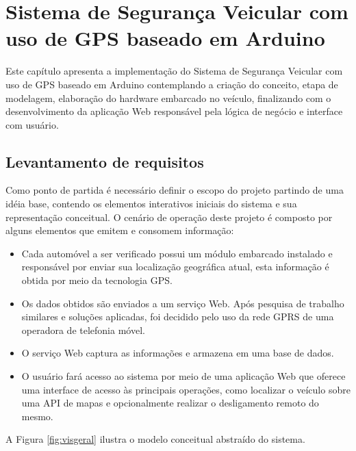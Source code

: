\chapter{Sistema de Seguran\c{c}a Veicular com uso de GPS baseado em Arduino}
\label{cap:prototipo do sistema}

Este capítulo apresenta a implementação do Sistema de Segurança Veicular com uso de GPS baseado em Arduino contemplando a criação do conceito, etapa de modelagem, elaboração do hardware embarcado no veículo, finalizando com o desenvolvimento da aplicação Web responsável pela lógica de negócio e interface com usuário.  

\section{Levantamento de requisitos}
Como ponto de partida é necessário definir o escopo do projeto partindo de uma idéia base, 
contendo os elementos interativos iniciais do sistema e sua representação conceitual. O cenário de operação
deste projeto é composto por alguns elementos que emitem e consomem informação:

\begin{itemize}
	\item Cada automóvel a ser verificado possui um módulo embarcado instalado e responsável por enviar sua 
	localização geográfica atual, esta informação é obtida por meio da tecnologia GPS. 
	\item  Os dados obtidos são enviados a um serviço Web. Após pesquisa de trabalho similares e soluções aplicadas,
	foi decidido pelo uso da rede GPRS de uma operadora de telefonia móvel.
  \item O serviço Web captura as informações e armazena em uma base de dados. 
	\item O usuário fará acesso ao sistema por meio de uma aplicação Web que oferece uma interface 
	de acesso às principais operações, como localizar o veículo sobre uma API de mapas e opcionalmente 
	realizar o desligamento remoto do mesmo. 
\end{itemize}

A Figura \ref{fig:visgeral} ilustra o modelo conceitual abstraído do sistema.

